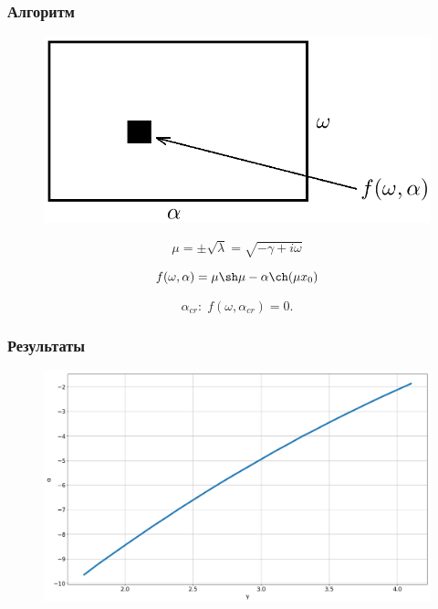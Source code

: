 \documentclass[fullscreen=true, unicode, bookmarks=false]{beamer}
\begin{document}
\begin{frame}
\frametitle{ Алгоритм } 

\begin{figure} 
\includegraphics[scale=0.4]{Scheme.png}  
\end{figure}

\pause

$$ \mu = \pm\sqrt{\lambda} = \sqrt{-\gamma + i \omega} $$

\begin{equation}\label{eq8}	
	f(\omega, \alpha) = \mu \sh \mu - \alpha \ch(\mu x_0)
\end{equation}

\pause

$$ \alpha_{cr}: \; f(\omega, \alpha_{cr}) = 0. $$

\end{frame}

\begin{frame}

\frametitle{Результаты} 

\begin{figure}
\includegraphics[scale=0.27]{x0=0.png} 
\end{figure}

\end{frame}
\end{document}
